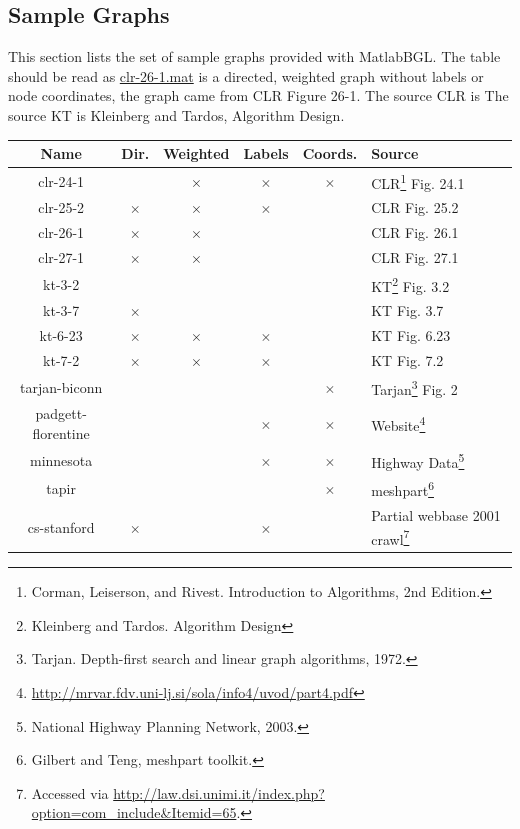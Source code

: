 \documentclass[12pt]{article}
\newcommand{\mycmd}[1]{\url{#1}}
\begin{document}
\subsection{Sample Graphs}
This section lists the set of sample graphs provided with MatlabBGL.  The table should be read as \mycmd{clr-26-1.mat} is a directed, weighted graph without labels or node coordinates, the graph came from CLR Figure 26-1.  The source CLR is   The source KT is Kleinberg and Tardos, Algorithm Design.  
\begin{center}
\begin{tabularx}{\linewidth}{c|cc|cc|X}
\textbf{Name} & \textbf{Dir.} & \textbf{Weighted} & \textbf{Labels} & \textbf{Coords.} & \textbf{Source}\\
\hline
clr-24-1 & & $\times$ & $\times$ & $\times$ & CLR\footnote{Corman, Leiserson, and Rivest. Introduction
 to Algorithms, 2nd Edition.} Fig. 24.1\\
clr-25-2 & $\times$ & $\times$ & $\times$ & & CLR Fig. 25.2\\
clr-26-1 & $\times$ & $\times$ & & & CLR Fig. 26.1\\
clr-27-1 &  $\times$ & $\times$ & & & CLR Fig. 27.1\\
kt-3-2 &  &  & & & KT\footnote{ Kleinberg and Tardos. Algorithm Design} Fig. 3.2\\
kt-3-7 & $\times$ &  & & & KT Fig. 3.7\\
kt-6-23 & $\times$ & $\times$ & $\times$ & & KT Fig. 6.23\\
kt-7-2 & $\times$ & $\times$ & $\times$& & KT Fig. 7.2\\
tarjan-biconn & & & & $\times$ & Tarjan\footnote{Tarjan.  Depth-first search and linear graph algorithms, 1972.} Fig. 2\\
padgett-florentine & & & $\times$ & $\times$ &  Website\footnote{\url{http://mrvar.fdv.uni-lj.si/sola/info4/uvod/part4.pdf}}\\
minnesota & & & $\times$ & $\times$ & Highway Data\footnote{National Highway Planning Network, 2003.}\\
tapir & & & & $\times$ & meshpart\footnote{Gilbert and Teng, meshpart toolkit.} \\
cs-stanford & $\times$ & & $\times$ & & Partial webbase 2001 crawl\footnote{Accessed via \url{http://law.dsi.unimi.it/index.php?option=com_include&Itemid=65}.}
\end{tabularx}
\end{center}


\end{document}
